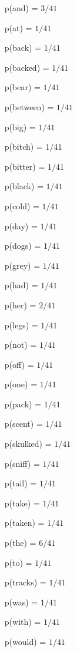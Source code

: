 \begin{enumerate}
\item[p(and) =] $3/41$
\item[p(at) =] $1/41$
\item[p(back) =] $1/41$
\item[p(backed) =] $1/41$
\item[p(bear) =] $1/41$
\item[p(between) =] $1/41$
\item[p(big) =] $1/41$
\item[p(bitch) =] $1/41$
\item[p(bitter) =] $1/41$
\item[p(black) =] $1/41$
\item[p(cold) =] $1/41$
\item[p(day) =] $1/41$
\item[p(dogs) =] $1/41$
\item[p(grey) =] $1/41$
\item[p(had) =] $1/41$
\item[p(her) =] $2/41$
\item[p(legs) =] $1/41$
\item[p(not) =] $1/41$
\item[p(off) =] $1/41$
\item[p(one) =] $1/41$
\item[p(pack) =] $1/41$
\item[p(scent) =] $1/41$
\item[p(skulked) =] $1/41$
\item[p(sniff) =] $1/41$
\item[p(tail) =] $1/41$
\item[p(take) =] $1/41$
\item[p(taken) =] $1/41$
\item[p(the) =] $6/41$
\item[p(to) =] $1/41$
\item[p(tracks) =] $1/41$
\item[p(was) =] $1/41$
\item[p(with) =] $1/41$
\item[p(would) =] $1/41$
\end{enumerate}